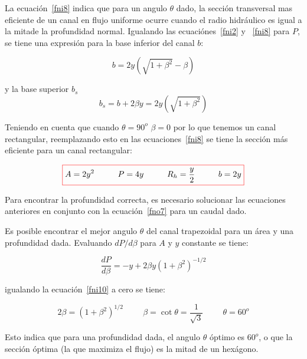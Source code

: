 \documentclass[11pt, oneside]{article}
\begin{document}
La ecuaci\'on~\ref{fni8} indica que para un angulo $\theta$ dado, la secci\'on transversal mas eficiente de un canal en flujo uniforme ocurre cuando el radio hidr\'aulico es igual a la mitade la profundidad normal. Igualando las ecuaci\'ones~\ref{fni2} y ~\ref{fni8} para $P$, se tiene una expresi\'on para la base inferior del canal $b$:

\begin{equation}
b = 2y\left(\sqrt{1+\beta^2} - \beta \right)
\label{fni8a}
\end{equation}
 
y la base superior $b_s$
\begin{equation}
b_s =b+2\beta y = 2y\left(\sqrt{1+\beta^2} \right)
\label{fni8b}
\end{equation}

Teniendo en cuenta que cuando $\theta = 90^o$ $\beta = 0$ por lo que tenemos un canal rectangular, reemplazando esto en las ecuaciones~\ref{fni8} se tiene la secci\'on m\'as eficiente para un canal rectangular:
    
\begin{equation}
\color{red}\boxed{\color{black} A = 2y^2 \hspace{1cm} P=4y  \hspace{1cm} R_h = \frac{y}{2} \hspace{1cm} b = 2y }
\label{fni9}
\end{equation}

Para encontrar la profundidad correcta, es necesario solucionar las ecuaciones anteriores en conjunto con la ecuaci\'on~\ref{fno7} para un caudal dado. 

Es posible encontrar el mejor angulo $\theta$ del canal trapezoidal para un \'area y una profundidad dada. Evaluando $dP/d\beta$ para $A$ y $y$ constante se tiene:

\begin{equation}
\frac{dP}{d\beta} = -y +2\beta y\left( 1 + \beta^2 \right)^{-1/2} 
\label{fni10}
\end{equation}

igualando la ecuaci\'on~\ref{fni10} a cero se tiene:

\begin{equation}
2\beta = \left( 1 + \beta^2 \right)^{1/2} \hspace{1cm} \beta=\cot \theta = \frac{1}{\sqrt{3}} \hspace{1cm} \theta=60^o
\label{fni10}
\end{equation}

Esto indica que para una profundidad dada, el angulo $\theta$ \'optimo es $60^o$, o que la secci\'on \'optima (la que maximiza el flujo) es la mitad de un hex\'agono. 
\end{document}

